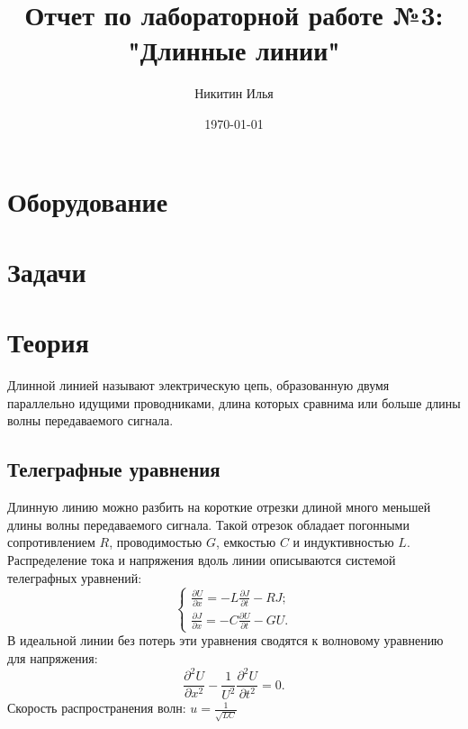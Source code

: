 \documentclass[a4paper,14pt]{extarticle}
\author{Никитин Илья}
\title{Отчет по лабораторной работе №3: "Длинные линии"}
\date{\today}
\begin{document}
	
	\maketitle
	\tableofcontents

	\section{Оборудование}
	
	\section{Задачи}
	
	\section{Теория}
		Длинной линией называют электрическую цепь, образованную двумя параллельно идущими проводниками, длина которых сравнима или больше длины волны передаваемого сигнала.
		\subsection{Телеграфные уравнения}
			Длинную линию можно разбить на короткие отрезки длиной много меньшей длины волны передаваемого сигнала. Такой отрезок обладает погонными сопротивлением $R$, проводимостью $G$, емкостью $C$ и индуктивностью $L$. Распределение тока и напряжения вдоль линии описываются системой телеграфных уравнений:
			\begin{equation}
				\begin{cases}
					\frac{\partial U}{\partial x} = -L \frac{\partial J}{\partial t} - R J;\\						\frac{\partial J}{\partial x} = -C \frac{\partial U}{\partial t} - G U.
				\end{cases}
			\end{equation}
		 	В идеальной линии без потерь эти уравнения сводятся к волновому уравнению для напряжения:
		 	\begin{equation}
				\frac{\partial^2 U}{\partial x^2} -\frac{1}{U^2} \frac{\partial^2 U}{\partial t^2} = 0.
		 	\end{equation}
		 	Скорость распространения волн: $u = \frac{1}{\sqrt{L C}}$
\end{document}
